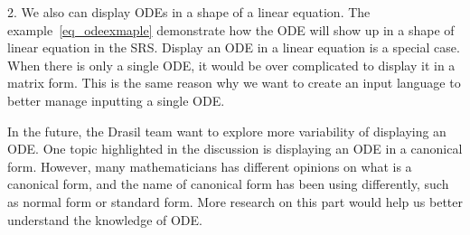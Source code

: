 2. We also can display ODEs in a shape of a linear equation. The example~\ref{eq_odeexmaple} demonstrate how the ODE will show up in a shape of linear equation in the SRS. Display an ODE in a linear equation is a special case. When there is only a single ODE, it would be over complicated to display it in a matrix form. This is the same reason why we want to create an input language to better manage inputting a single ODE.

In the future, the Drasil team want to explore more variability of displaying an ODE. One topic highlighted in the discussion is displaying an ODE in a canonical form. However, many mathematicians has different opinions on what is a canonical form, and the name of canonical form has been using differently, such as normal form or standard form. More research on this part would help us better understand the knowledge of ODE.
